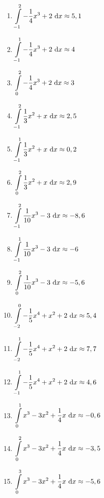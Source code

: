 \begin{Answer}[ref=integralGrafisch1]

    \begin{minipage}{\textwidth}
        \begin{minipage}{0.5\textwidth}
            \begin{enumerate}[label=\alph*)]
                \item \(\displaystyle\int\limits_{-1}^{2} -\frac{1}{4}x^3+2\ \text{d} x\approx 5,1\)
                \item \(\displaystyle\int\limits_{-1}^{1} -\frac{1}{4}x^3+2\ \text{d} x\approx 4\)
                \item \(\displaystyle\int\limits_{0}^{2} -\frac{1}{4}x^3+2\ \text{d} x\approx 3\)

                \item \(\displaystyle\int\limits_{-1}^{2} \frac{1}{3}x^2+x\ \text{d} x\approx 2,5\)
                \item \(\displaystyle\int\limits_{-1}^{1} \frac{1}{3}x^2+x\ \text{d} x\approx 0,2\)
                \item \(\displaystyle\int\limits_{0}^{2} \frac{1}{3}x^2+x\ \text{d} x\approx 2,9\)

                \item \(\displaystyle\int\limits_{-1}^{2} \frac{1}{10}x^3-3\ \text{d} x\approx -8,6\)
                \item \(\displaystyle\int\limits_{-1}^{1} \frac{1}{10}x^3-3\ \text{d} x\approx -6\)
                \item \(\displaystyle\int\limits_{0}^{2} \frac{1}{10}x^3-3\ \text{d} x\approx -5,6\)
            \end{enumerate}
        \end{minipage}%
        \begin{minipage}{0.5\textwidth}
            \begin{enumerate}[label=\alph*)]
                \setcounter{enumi}{9}
                \item \(\displaystyle\int\limits_{-2}^{0} -\frac{1}{5}x^4+x^2+2\ \text{d} x\approx 5,4\)
                \item \(\displaystyle\int\limits_{-2}^{1} -\frac{1}{5}x^4+x^2+2\ \text{d} x\approx 7,7\)
                \item \(\displaystyle\int\limits_{-1}^{1} -\frac{1}{5}x^4+x^2+2\ \text{d} x\approx 4,6\)

                \item \(\displaystyle\int\limits_{0}^{1} x^3-3x^2+\frac{1}{4}x\ \text{d} x\approx -0,6\)
                \item \(\displaystyle\int\limits_{0}^{2} x^3-3x^2+\frac{1}{4}x\ \text{d} x\approx -3,5\)
                \item \(\displaystyle\int\limits_{0}^{3} x^3-3x^2+\frac{1}{4}x\ \text{d} x\approx -5,6\)


\end{enumerate}
\end{minipage}
\end{minipage}
\end{Answer}
